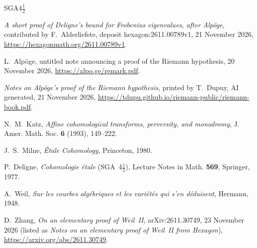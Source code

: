 \documentclass[reqno]{amsart}
\theoremstyle{definition}
\theoremstyle{plain}
\begin{document}
\begin{thebibliography}{SGA4\(\frac12\)}

\emph{A short proof of Deligne's bound for Frobenius eigenvalues, after Alpöge}, contributed by F.~Alderliefste, deposit hexagon:2611.00789v1, 21 November 2026, \url{https://hexagonmath.org/2611.00789v1}.

L.~Alp\"oge, untitled note announcing a proof of the Riemann hypothesis, 20 November 2026, \url{https://alpo.ge/remark.pdf}.

\emph{Notes on Alpöge's proof of the Riemann hypothesis}, printed by T.~Dupuy, AI generated, 21 November 2026, \url{https://tdupu.github.io/riemann-public/riemann-book.pdf}.

N.~M.~Katz, \emph{Affine cohomological transforms, perversity, and monodromy}, J. Amer. Math. Soc. \textbf{6} (1993), 149--222.

J.~S.~Milne, \emph{\'Etale Cohomology}, Princeton, 1980.

P.~Deligne, \emph{Cohomologie \'etale} (SGA~4\(\frac12\)), Lecture Notes in Math. \textbf{569}, Springer, 1977.

A.~Weil, \emph{Sur les courbes alg\'ebriques et les vari\'et\'es qui s'en d\'eduisent}, Hermann, 1948.

D.~Zhang, \emph{On an elementary proof of Weil~II}, arXiv:2611.30749, 23 November 2026 (listed as \emph{Notes on an elementary proof of Weil~II from Hexagon}), \url{https://arxiv.org/abs/2611.30749}.

\end{thebibliography}
\end{document}

